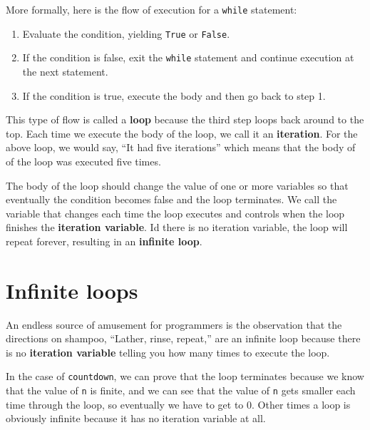 \documentclass[10pt]{book}
\begin{document}

More formally, here is the flow of execution for a {\tt while} statement:

\begin{enumerate}

\item Evaluate the condition, yielding {\tt True} or {\tt False}.

\item If the condition is false, exit the {\tt while} statement
and continue execution at the next statement.

\item If the condition is true, execute the
body and then go back to step 1.

\end{enumerate}

This type of flow is called a {\bf loop} because the third step
loops back around to the top.  Each time we execute the body of 
the loop, we call it an {\bf iteration}.  For the above loop, we 
would say, ``It had five iterations'' which means that the body of
of the loop was executed five times.


The body of the loop should change the value of one or more variables
so that eventually the condition becomes false and the loop
terminates.  
We call the variable that changes each time the loop
executes and controls when the loop finishes the 
{\bf iteration variable}.
Id there is no iteration variable, the loop will repeat forever, 
resulting in an {\bf infinite loop}.  

\section{Infinite loops}

An endless source of amusement for 
programmers is the observation that the directions on shampoo,
``Lather, rinse, repeat,'' are an infinite loop because 
there is no {\bf iteration variable} telling you how many times
to execute the loop.


In the case of {\tt countdown}, we can prove that the loop
terminates because we know that the value of {\tt n} is finite, and we
can see that the value of {\tt n} gets smaller each time through the
loop, so eventually we have to get to 0.  Other times a loop is obviously
infinite because it has no iteration variable at all.
\end{document}
